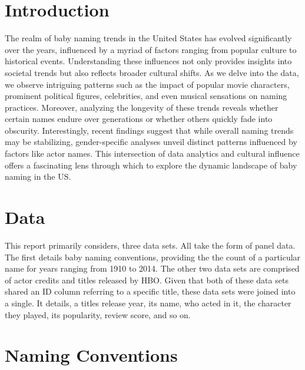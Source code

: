 \documentclass[11pt,preprint, authoryear]{elsarticle}
\numberwithin{equation}{section}
\numberwithin{figure}{section}
\numberwithin{table}{section}
\begin{document}

\headsep 35pt %




\section{\texorpdfstring{Introduction
\label{Introduction}}{Introduction }}\label{introduction}

The realm of baby naming trends in the United States has evolved
significantly over the years, influenced by a myriad of factors ranging
from popular culture to historical events. Understanding these
influences not only provides insights into societal trends but also
reflects broader cultural shifts. As we delve into the data, we observe
intriguing patterns such as the impact of popular movie characters,
prominent political figures, celebrities, and even musical sensations on
naming practices. Moreover, analyzing the longevity of these trends
reveals whether certain names endure over generations or whether others
quickly fade into obscurity. Interestingly, recent findings suggest that
while overall naming trends may be stabilizing, gender-specific analyses
unveil distinct patterns influenced by factors like actor names. This
intersection of data analytics and cultural influence offers a
fascinating lens through which to explore the dynamic landscape of baby
naming in the US.

\section*{Data}\label{data}

This report primarily considers, three data sets. All take the form of
panel data. The first details baby naming conventions, providing the the
count of a particular name for years ranging from 1910 to 2014. The
other two data sets are comprised of actor credits and titles released
by HBO. Given that both of these data sets shared an ID column referring
to a specific title, these data sets were joined into a single. It
details, a titles release year, its name, who acted in it, the character
they played, its popularity, review score, and so on.

\section*{Naming Conventions}\label{naming-conventions}
\end{document}
